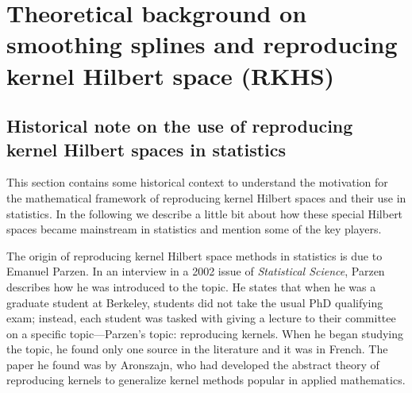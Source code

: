 \section{Theoretical background on smoothing splines and reproducing kernel Hilbert space (RKHS)}
 \label{ch:theoretical background}


\subsection{Historical note on the use of reproducing kernel Hilbert spaces in statistics}

This section contains some historical context to understand the motivation for the mathematical framework of reproducing kernel Hilbert spaces and their use in statistics. In the following we describe a little bit about how these special Hilbert spaces became mainstream in statistics and mention some of the key players. 


The origin of reproducing kernel Hilbert space methods in statistics is due to Emanuel Parzen. In an interview in a 2002 issue of \emph{Statistical Science}, Parzen describes how he was introduced to the topic. He states that when he was a graduate student at Berkeley, students did not take the usual PhD qualifying exam; instead, each student was tasked with giving a lecture to their committee on a specific topic---Parzen's topic: reproducing kernels. When he began studying the topic, he found only one source in the literature and it was in French. The paper he found was by Aronszajn, who had developed the abstract theory of reproducing kernels to generalize kernel methods popular in applied mathematics. 

